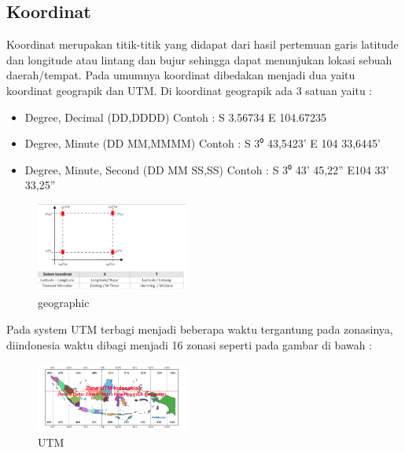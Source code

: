 \subsection{Koordinat}
Koordinat merupakan titik-titik yang didapat dari hasil pertemuan garis latitude dan longitude atau lintang dan bujur sehingga dapat menunjukan lokasi sebuah daerah/tempat. Pada umumnya koordinat dibedakan menjadi dua yaitu koordinat geograpik dan UTM. Di koordinat geograpik ada 3 satuan yaitu :
\begin{itemize}
\item Degree, Decimal (DD,DDDD) Contoh : S 3.56734 E 104.67235
\item Degree, Minute (DD MM,MMMM) Contoh : S 3⁰ 43,5423’ E 104 33,6445’
\item Degree, Minute, Second (DD MM SS,SS) Contoh : S 3⁰ 43’ 45,22” E104 33’ 33,25”
\end{itemize}

\begin{figure}[H]
	\includegraphics[width=5cm]{figures/1174009/t1.png}
	\centering
	\caption{geographic}
\end{figure}

Pada system UTM terbagi menjadi beberapa  waktu tergantung pada zonasinya, diindonesia waktu dibagi menjadi 16 zonasi seperti pada gambar di bawah :
\begin{figure}[H]
	\includegraphics[width=5cm]{figures/1174009/t2.png}
	\centering
	\caption{UTM}
\end{figure}

